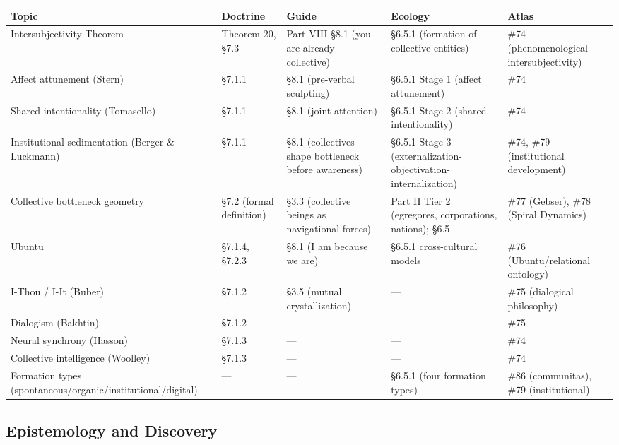 \begin{longtable}{p{} p{} p{} p{} p{}}
\toprule
\textbf{Topic} & \textbf{Doctrine} & \textbf{Guide} & \textbf{Ecology} & \textbf{Atlas} \\
\midrule
\endhead
Intersubjectivity Theorem & Theorem 20, §7.3 & Part VIII §8.1 (you are already collective) & §6.5.1 (formation of collective entities) & \#74 (phenomenological intersubjectivity) \\
Affect attunement (Stern) & §7.1.1 & §8.1 (pre-verbal sculpting) & §6.5.1 Stage 1 (affect attunement) & \#74 \\
Shared intentionality (Tomasello) & §7.1.1 & §8.1 (joint attention) & §6.5.1 Stage 2 (shared intentionality) & \#74 \\
Institutional sedimentation (Berger \& Luckmann) & §7.1.1 & §8.1 (collectives shape bottleneck before awareness) & §6.5.1 Stage 3 (externalization-objectivation-internalization) & \#74, \#79 (institutional development) \\
Collective bottleneck geometry & §7.2 (formal definition) & §3.3 (collective beings as navigational forces) & Part II Tier 2 (egregores, corporations, nations); §6.5 & \#77 (Gebser), \#78 (Spiral Dynamics) \\
Ubuntu & §7.1.4, §7.2.3 & §8.1 (I am because we are) & §6.5.1 cross-cultural models & \#76 (Ubuntu/relational ontology) \\
I-Thou / I-It (Buber) & §7.1.2 & §3.5 (mutual crystallization) & — & \#75 (dialogical philosophy) \\
Dialogism (Bakhtin) & §7.1.2 & — & — & \#75 \\
Neural synchrony (Hasson) & §7.1.3 & — & — & \#74 \\
Collective intelligence (Woolley) & §7.1.3 & — & — & \#74 \\
Formation types (spontaneous/organic/institutional/digital) & — & — & §6.5.1 (four formation types) & \#86 (communitas), \#79 (institutional) \\
\bottomrule
\end{longtable}



\subsection*{Epistemology and Discovery}



